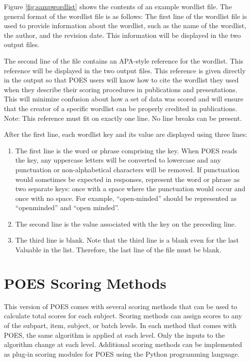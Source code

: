 \documentclass[11pt]{article}
\numberwithin{figure}{section}
\numberwithin{table}{section}
\begin{document}
Figure \ref{fig:sampwordlist} shows the contents of an example wordlist file. The general format of the wordlist file is as follows:
The first line of the wordlist file is used to provide information about the wordlist, such as the name of the wordlist, the author, and the revision date.  This information will be displayed in the two output files.

The second line of the file contains an APA-style reference for the wordlist.  This reference will be displayed in the two output files.  This reference is given directly in the output so that POES users will know how to cite the wordlist they used when they describe their scoring procedures in publications and presentations.  This will minimize confusion about how a set of data was scored and will ensure that the creator of a specific wordlist can be properly credited in publications.  Note: This reference must fit on exactly one line.  No line breaks can be present.

After the first line, each wordlist key and its value are displayed using three lines:
\begin{enumerate}
\item The first line is the word or phrase comprising the key.
When POES reads the key, any uppercase letters will be converted to lowercase and any punctuation or non-alphabetical characters will be removed.  If punctuation would sometimes be expected in responses, represent the word or phrase as two separate keys: once with a space where the punctuation would occur and once with no space. For example, ``open-minded'' should be represented as ``openminded'' and ``open minded''. 
\item The second line is the value associated with the key on the preceding line.  
\item The third line is blank.  Note that the third line is a blank even for the last Valuable in the list.  Therefore, the last line of the file must be blank.
\end{enumerate}


 
 
\section{POES Scoring Methods}
\label{sec:scoringmethods}

This version of POES comes with several scoring methods that can be used to calculate total scores for each subject.  Scoring methods can assign scores to any of the subpart, item, subject, or batch levels.  In each method that comes with POES, the same algorithm is applied at each level.  Only the inputs to the algorithm change at each level.   Additional scoring methods can be implemented as plug-in scoring modules for POES using the Python programming language.
\end{document}
